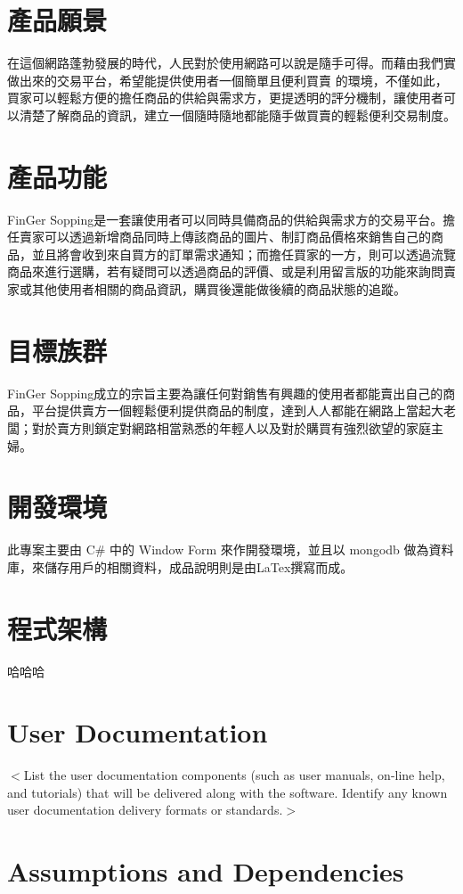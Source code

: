 \documentclass{scrreprt}
\begin{document}
\begin{CJK}{UTF8}{bkai}
\section{產品願景}
\qquad 在這個網路蓬勃發展的時代，人民對於使用網路可以說是隨手可得。而藉由我們實做出來的交易平台，希望能提供使用者一個簡單且便利買賣
的環境，不僅如此，買家可以輕鬆方便的擔任商品的供給與需求方，更提透明的評分機制，讓使用者可以清楚了解商品的資訊，建立一個隨時隨地都能隨手做買賣的輕鬆便利交易制度。

\section{產品功能}
\qquad FinGer Sopping是一套讓使用者可以同時具備商品的供給與需求方的交易平台。擔任賣家可以透過新增商品同時上傳該商品的圖片、制訂商品價格來銷售自己的商品，並且將會收到來自買方的訂單需求通知；而擔任買家的一方，則可以透過流覽商品來進行選購，若有疑問可以透過商品的評價、或是利用留言版的功能來詢問賣家或其他使用者相關的商品資訊，購買後還能做後續的商品狀態的追蹤。

\section{目標族群}
\qquad FinGer Sopping成立的宗旨主要為讓任何對銷售有興趣的使用者都能賣出自己的商品，平台提供賣方一個輕鬆便利提供商品的制度，達到人人都能在網路上當起大老闆；對於賣方則鎖定對網路相當熟悉的年輕人以及對於購買有強烈欲望的家庭主婦。

\section{開發環境}
\qquad 此專案主要由 C\# 中的 Window Form 來作開發環境，並且以 mongodb 做為資料庫，來儲存用戶的相關資料，成品說明則是由LaTex撰寫而成。

\section{程式架構}
哈哈哈

\section{User Documentation}
$<$List the user documentation components (such as user manuals, on-line help, 
and tutorials) that will be delivered along with the software. Identify any 
known user documentation delivery formats or standards.$>$
\section{Assumptions and Dependencies}


\end{CJK}
\end{document}
